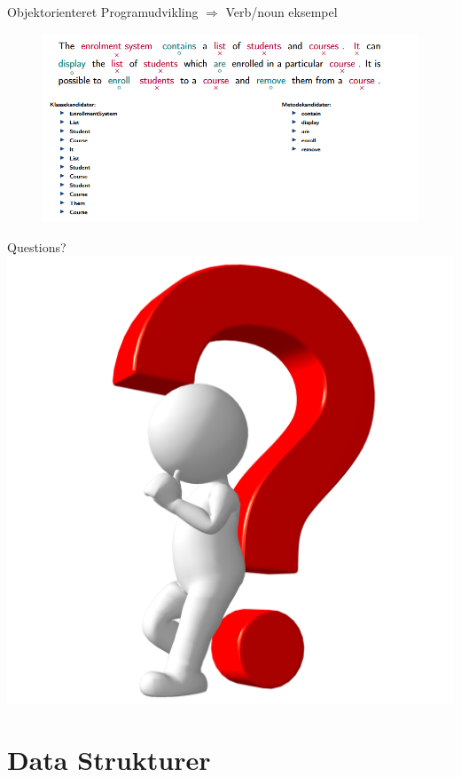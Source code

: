 \documentclass[10pt,aspectratio=1610]{beamer}
\begin{document}
\begin{frame}{Objektorienteret Programudvikling $\Rightarrow$ Verb/noun eksempel}
    \begin{figure}
        \centering
        \includegraphics[width=\linewidth]{images/verb.png}
       
    \end{figure}
\end{frame}


\begin{frame}{Questions?}
            \includegraphics[width=\linewidth, height=\paperheight]{images/man-with-question-01.png}
\end{frame}

\section{Data Strukturer}
\end{document}

